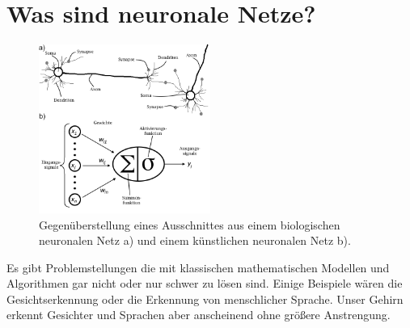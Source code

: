 

\section{Was sind neuronale Netze?}

\begin{figure}
    \centering
        \includegraphics[width=0.5\textwidth]{Bilder/BNN_ANN.png}
    \caption{Gegenüberstellung eines Ausschnittes aus einem biologischen neuronalen Netz a)\protect\footnotemark{} und einem künstlichen neuronalen Netz b).}
    \label{fig:BNN_ANN}
\end{figure}

\addtocounter{footnote}{-1}%
\addtocounter{Hfootnote}{-1}%
\wrapfigfoot{}

Es gibt Problemstellungen die mit klassischen mathematischen Modellen und Algorithmen gar nicht oder nur schwer zu lösen sind. Einige Beispiele wären die Gesichtserkennung oder die Erkennung von menschlicher Sprache. Unser Gehirn erkennt Gesichter und Sprachen aber anscheinend ohne größere Anstrengung.

